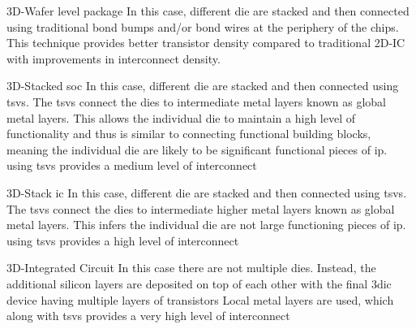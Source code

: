 \begin{outline}

  \1 3D-Wafer level package \cite{itrs2015_interconn}
    \2 In this case, different die are stacked and then connected using traditional bond bumps and/or bond wires at the periphery of the chips.
    \2 This technique provides better transistor density compared to traditional 2D-IC with improvements in interconnect density.

  \1 3D-Stacked \ac{soc} \cite{itrs2015_interconn}
    \2 In this case, different die are stacked and then connected using \acp{tsv}. The \acp{tsv} connect the dies to intermediate metal layers known as global metal layers. This allows the individual die to maintain a high level of functionality and thus is similar to connecting functional building blocks, meaning the individual die are likely to be significant functional pieces of \ac{ip}.
    \2 using \acp{tsv} provides a medium level of interconnect

  \1 3D-Stack \ac{ic} \cite{itrs2015_interconn}
    \2 In this case, different die are stacked and then connected using \acp{tsv}. The \acp{tsv} connect the dies to intermediate higher metal layers known as global metal layers. This infers the individual die are not large functioning pieces of \ac{ip}.
    \2 using \acp{tsv} provides a high level of interconnect

  \1 3D-Integrated Circuit \cite{itrs2015_interconn}
    \2 In this case there are not multiple dies. Instead, the additional silicon layers are deposited on top of each other with the final \ac{3dic} device having multiple layers of transistors
    \2 Local metal layers are used, which along with \acp{tsv} provides a very high level of interconnect
\end{outline}

